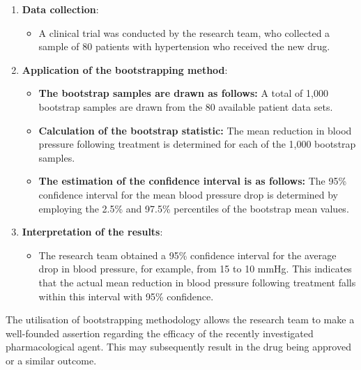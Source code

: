 \begin{enumerate}
    \item \textbf{Data collection}:
    \begin{itemize}
        \item A clinical trial was conducted by the research team, who collected a sample of 80 patients with hypertension who received the new drug.
    \end{itemize}
    
    \item \textbf{Application of the bootstrapping method}:
    \begin{itemize}
        \item \textbf{The bootstrap samples are drawn as follows:} A total of 1,000 bootstrap samples are drawn from the 80 available patient data sets.
        \item \textbf{Calculation of the bootstrap statistic:} The mean reduction in blood pressure following treatment is determined for each of the 1,000 bootstrap samples.
        \item \textbf{The estimation of the confidence interval is as follows: }The 95\% confidence interval for the mean blood pressure drop is determined by employing the 2.5\% and 97.5\% percentiles of the bootstrap mean values.
    \end{itemize}
    
    \item \textbf{Interpretation of the results}:
    \begin{itemize}
        \item The research team obtained a 95\% confidence interval for the average drop in blood pressure, for example, from 15 to 10 mmHg. This indicates that the actual mean reduction in blood pressure following treatment falls within this interval with 95\% confidence.
    \end{itemize}
\end{enumerate}

The utilisation of bootstrapping methodology allows the research team to make a well-founded assertion regarding the efficacy of the recently investigated pharmacological agent. This may subsequently result in the drug being approved or a similar outcome.
